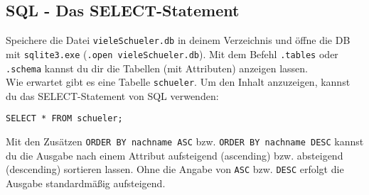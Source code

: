 \subsection[SELECT-Statement]{SQL - Das SELECT-Statement}\label{select}
Speichere die Datei \texttt{vieleSchueler.db} in deinem Verzeichnis und öffne die DB mit \texttt{sqlite3.exe} (\lstinline!.open vieleSchueler.db!). Mit dem Befehl \lstinline!.tables! oder \lstinline!.schema! kannst du dir die Tabellen (mit Attributen) anzeigen lassen.\\
Wie erwartet gibt es eine Tabelle \lstinline!schueler!. Um den Inhalt anzuzeigen, kannst du das SELECT-Statement von SQL verwenden:
\begin{tcolorbox}[title=SELECT-Statement]
	\lstinline!SELECT * FROM schueler;!
\end{tcolorbox}
Mit den Zusätzen \lstinline!ORDER BY nachname ASC! bzw. \lstinline!ORDER BY nachname DESC!  kannst du die Ausgabe nach einem Attribut aufsteigend (ascending) bzw. absteigend (descending) sortieren lassen. Ohne die Angabe von \lstinline!ASC! bzw. \lstinline!DESC! erfolgt die Ausgabe standardmäßig aufsteigend.

